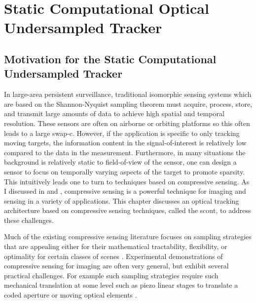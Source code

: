 \chapter{Static Computational Optical Undersampled Tracker}\label{chap:Scout}

\section{Motivation for the Static Computational Undersampled Tracker}

In large-area persistent surveillance, traditional \gls{isomorphic} sensing systems which are based on the Shannon-Nyquist sampling theorem must acquire, process, store, and transmit large amounts of data to achieve high spatial and temporal resolution. These sensors are often on airborne or orbiting platforms so this often leads to a large \gls{swap-c}. However, if the application is specific to only tracking moving targets, the information content in the signal-of-interest is relatively low compared to the data in the measurement. Furthermore, in many situations the background is relatively static to field-of-view of the sensor, one can design a sensor to focus on temporally varying aspects of the target to promote \gls{sparsity}. This intuitively leads one to turn to techniques based on \gls{compressive sensing}. As I discussed in  and , \gls{compressive sensing} is a powerful technique for imaging and sensing in a variety of applications. This chapter discusses an optical tracking architecture based on compressive sensing techniques, called the \acrfull{scout}, to address these challenges.

Much of the existing \gls{compressive sensing} literature focuses on sampling strategies that are appealing either for their mathematical tractability, flexibility, or optimality for certain classes of scenes \cite{candes2006near, candes2006robust, tropp2006just}. Experimental demonstrations of \gls{compressive sensing} for imaging are often very general, but exhibit several practical challenges. For example such sampling strategies require such mechanical translation at some level such as piezo linear stages to translate a coded aperture \cite{llull2013coded} or moving optical elements \cite{stern2013compressive}.

